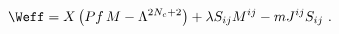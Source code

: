 \begin{equation}
\label{eq:Superpot1}
\Weff= X\left( Pf \, M - \Lambda^{2N_c+2} \right)+ \lambda S_{ij}M^{ij} 
-m J^{ij}S_{ij} \ .
\end{equation}


